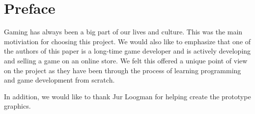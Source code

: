 \chapter*{Preface}
\thispagestyle{empty}

Gaming has always been a big part of our lives and culture. 
This was the main motiviation for choosing this project.
We would also like to emphasize that one of the authors of this paper is a long-time game developer and is actively developing and selling a game on an online store. 
We felt this offered a unique point of view on the project as they have been through the process of learning programming and game development from scratch. 

In addition, we would like to thank Jur Loogman for helping create the \dazel{} prototype graphics.
